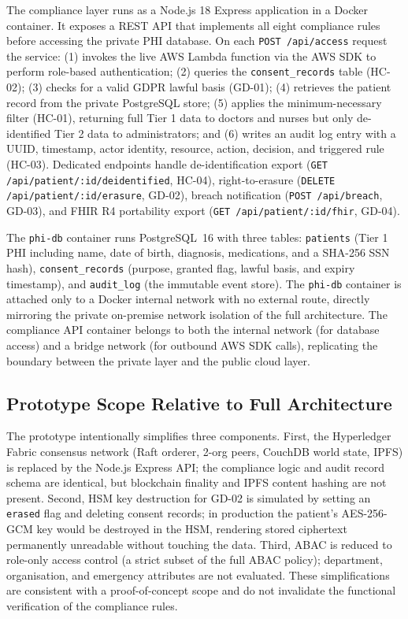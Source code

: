 \documentclass[10pt,twocolumn,a4paper]{article}
\begin{document}
The compliance layer runs as a Node.js 18 Express application in a
Docker container. It exposes a REST API that implements all eight
compliance rules before accessing the private PHI database. On each
\texttt{POST /api/access} request the service: (1) invokes the live
AWS Lambda function via the AWS SDK to perform role-based authentication;
(2) queries the \texttt{consent\_records} table (HC-02); (3) checks for
a valid GDPR lawful basis (GD-01); (4) retrieves the patient record from
the private PostgreSQL store; (5) applies the minimum-necessary filter
(HC-01), returning full Tier 1 data to doctors and nurses but only
de-identified Tier 2 data to administrators; and (6) writes an audit
log entry with a UUID, timestamp, actor identity, resource, action,
decision, and triggered rule (HC-03). Dedicated endpoints handle
de-identification export (\texttt{GET /api/patient/:id/deidentified},
HC-04), right-to-erasure (\texttt{DELETE /api/patient/:id/erasure},
GD-02), breach notification (\texttt{POST /api/breach}, GD-03), and
FHIR R4 portability export (\texttt{GET /api/patient/:id/fhir}, GD-04).

The \texttt{phi-db} container runs PostgreSQL~16 with three tables:
\texttt{patients} (Tier 1 PHI including name, date of birth, diagnosis,
medications, and a SHA-256 SSN hash), \texttt{consent\_records} (purpose,
granted flag, lawful basis, and expiry timestamp), and \texttt{audit\_log}
(the immutable event store). The \texttt{phi-db} container is attached
only to a Docker internal network with no external route, directly
mirroring the private on-premise network isolation of the full
architecture. The compliance API container belongs to both the internal
network (for database access) and a bridge network (for outbound AWS SDK
calls), replicating the boundary between the private layer and the
public cloud layer.

\subsection{Prototype Scope Relative to Full Architecture}

The prototype intentionally simplifies three components. First, the
Hyperledger Fabric consensus network (Raft orderer, 2-org peers,
CouchDB world state, IPFS) is replaced by the Node.js Express API;
the compliance logic and audit record schema are identical, but
blockchain finality and IPFS content hashing are not present. Second,
HSM key destruction for GD-02 is simulated by setting an
\texttt{erased} flag and deleting consent records; in production the
patient's AES-256-GCM key would be destroyed in the HSM, rendering
stored ciphertext permanently unreadable without touching the data.
Third, ABAC is reduced to role-only access control (a strict subset
of the full ABAC policy); department, organisation, and emergency
attributes are not evaluated. These simplifications are consistent
with a proof-of-concept scope and do not invalidate the functional
verification of the compliance rules.
\end{document}

